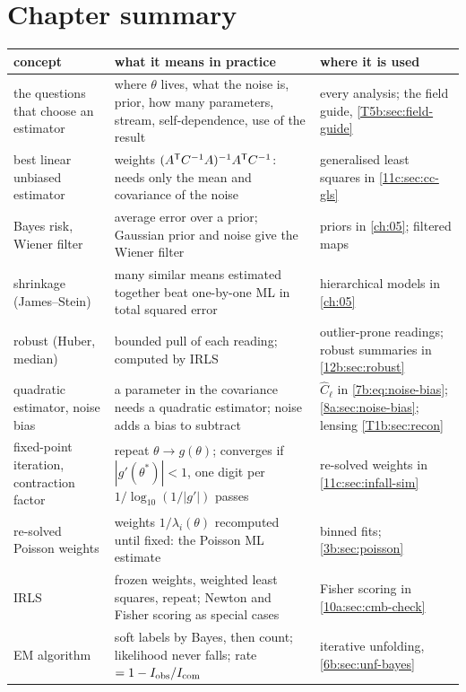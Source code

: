 \section*{Chapter summary}
\label{T5b:sec:summary}

\begin{center}
\small
\begin{tabularx}{\linewidth}{@{}>{\raggedright}p{30mm}>{\raggedright}X>{\raggedright\arraybackslash}p{30mm}@{}}
\toprule
concept & what it means in practice & where it is used\\
\midrule
the questions that choose an estimator & where $\theta$ lives, what the noise is, prior, how many parameters, stream, self-dependence, use of the result & every analysis; the field guide, \cref{T5b:sec:field-guide}\\
best linear unbiased estimator & weights $(A^{\mathsf{T}} C^{-1}A)^{-1}A^{\mathsf{T}} C^{-1}$: needs only the mean and covariance of the noise & generalised least squares in \cref{11c:sec:cc-gls}\\
Bayes risk, Wiener filter & average error over a prior; Gaussian prior and noise give the Wiener filter & priors in \cref{ch:05}; filtered maps \\
shrinkage (James--Stein) & many similar means estimated together beat one-by-one ML in total squared error & hierarchical models in \cref{ch:05}\\
robust (Huber, median) & bounded pull of each reading; computed by IRLS & outlier-prone readings; robust summaries in \cref{12b:sec:robust}\\
quadratic estimator, noise bias & a parameter in the covariance needs a quadratic estimator; noise adds a bias to subtract & $\hat C_\ell$ in \cref{7b:eq:noise-bias}; \cref{8a:sec:noise-bias}; lensing \cref{T1b:sec:recon}\\
fixed-point iteration, contraction factor & repeat $\theta\to g(\theta)$; converges if $|g'(\theta^*)|<1$, one digit per $1/\log_{10}(1/|g'|)$ passes & re-solved weights in \cref{11c:sec:infall-sim}\\
re-solved Poisson weights & weights $1/\lambda_i(\theta)$ recomputed until fixed: the Poisson ML estimate & binned fits; \cref{3b:sec:poisson}\\
IRLS & frozen weights, weighted least squares, repeat; Newton and Fisher scoring as special cases & Fisher scoring in \cref{10a:sec:cmb-check}\\
EM algorithm & soft labels by Bayes, then count; likelihood never falls; rate $=1-I_{\rm obs}/I_{\rm com}$ & iterative unfolding, \cref{6b:sec:unf-bayes}\\

\end{tabularx}
\end{center}
